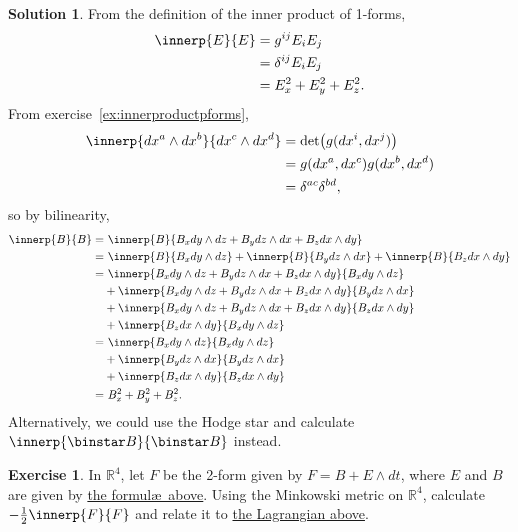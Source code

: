 \documentclass[11pt, a4paper]{report}
\theoremstyle{definition}
\newtheorem{exercise}{Exercise}[part]
\newtheorem{solution}{Solution}[part]
\newenvironment{ex}{\begin{exercise}}{\end{exercise}\pagebreak[1]}
\newenvironment{sol}{\begin{solution}}{\end{solution}\pagebreak[3]}
\newcommand*{\op}[1]{\ensuremath\mathop{}\mathopen{}#1}
\renewcommand*{\star}{\op{\binstar}\mathord{}}
\begin{document}
\begin{sol}

From the definition of the inner product of 1-forms,
\begin{align*}
    \innerp{E}{E} &= g^{ij} E_i E_j \\
                  &= \delta^{ij} E_i E_j \\
                  &= E_x^2 + E_y^2 + E_z^2.
\end{align*}
From exercise~\ref{ex:innerproductpforms},
\begin{align*}
    \innerp{dx^a \wedge dx^b}{dx^c \wedge dx^d} &= \det \bigl(g(dx^i, dx^j)\bigr) \\
        &= g(dx^a, dx^c) g(dx^b, dx^d) \\
        &= \delta^{ac} \delta^{bd},
\end{align*}
so by bilinearity,
\begin{align*}
    \innerp{B}{B} =&\ \innerp{B}{B_x dy \wedge dz + B_y dz \wedge dx + B_z dx \wedge dy} \\
        =&\ \innerp{B}{B_x dy \wedge dz}
            + \innerp{B}{B_y dz \wedge dx}
            + \innerp{B}{B_z dx \wedge dy} \\
        =&\ \innerp{B_x dy \wedge dz + B_y dz \wedge dx + B_z dx \wedge dy}
                   {B_x dy \wedge dz} \\
        &+ \innerp{B_x dy \wedge dz + B_y dz \wedge dx + B_z dx \wedge dy}
                  {B_y dz \wedge dx} \\
        &+ \innerp{B_x dy \wedge dz + B_y dz \wedge dx + B_z dx \wedge dy}
                  {B_z dx \wedge dy} \\
        &+ \innerp{B_z dx \wedge dy}{B_x dy \wedge dz} \\
        =&\ \innerp{B_x dy \wedge dz}{B_x dy \wedge dz} \\
        &+ \innerp{B_y dz \wedge dx}{B_y dz \wedge dx} \\
        &+ \innerp{B_z dx \wedge dy}{B_z dx \wedge dy} \\
        =&\ B_x^2 + B_y^2 + B_z^2.
\end{align*}
Alternatively, we could use the Hodge star and calculate $\innerp{\star B}{\star B}$ instead.

\end{sol}

\begin{ex}

In $\mathbb{R}^4$, let $F$ be the 2-form given by $F = B + E \wedge dt$, where $E$ and $B$ are given by \hyperref[ex:esquaredbsquared]{the formul\ae\ above}. Using the Minkowski metric on $\mathbb{R}^4$, calculate $-\frac{1}{2} \innerp{F}{F}$ and relate it to \hyperlink{eq:emlagrangianvacuum}{the Lagrangian above}.

\end{ex}
\end{document}
